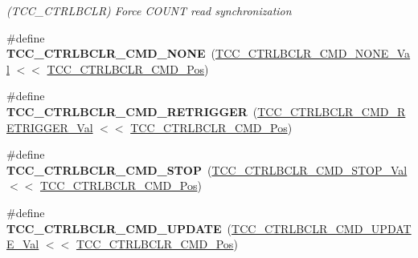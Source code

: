 \begin{DoxyCompactItemize}
\begin{DoxyCompactList}\small\item\em (T\+C\+C\+\_\+\+C\+T\+R\+L\+B\+C\+L\+R) Force C\+O\+U\+N\+T read synchronization \end{DoxyCompactList}\item 
\hypertarget{group___s_a_m_l21___t_c_c_ga9347040be57a1cf3a8c98400a5c7bdc2}{}\#define {\bfseries T\+C\+C\+\_\+\+C\+T\+R\+L\+B\+C\+L\+R\+\_\+\+C\+M\+D\+\_\+\+N\+O\+N\+E}~(\hyperlink{group___s_a_m_l21___t_c_c_ga6487842fdbdc4611ec51f7b8d14a4793}{T\+C\+C\+\_\+\+C\+T\+R\+L\+B\+C\+L\+R\+\_\+\+C\+M\+D\+\_\+\+N\+O\+N\+E\+\_\+\+Val}     $<$$<$ \hyperlink{group___s_a_m_l21___t_c_c_gadd633ac48572abb4f937fcbf892ef5e3}{T\+C\+C\+\_\+\+C\+T\+R\+L\+B\+C\+L\+R\+\_\+\+C\+M\+D\+\_\+\+Pos})\label{group___s_a_m_l21___t_c_c_ga9347040be57a1cf3a8c98400a5c7bdc2}

\item 
\hypertarget{group___s_a_m_l21___t_c_c_ga9b4ef0ecab4c2a201278e3179533f19a}{}\#define {\bfseries T\+C\+C\+\_\+\+C\+T\+R\+L\+B\+C\+L\+R\+\_\+\+C\+M\+D\+\_\+\+R\+E\+T\+R\+I\+G\+G\+E\+R}~(\hyperlink{group___s_a_m_l21___t_c_c_gafd176e0bf11648db1508e16fd14604b3}{T\+C\+C\+\_\+\+C\+T\+R\+L\+B\+C\+L\+R\+\_\+\+C\+M\+D\+\_\+\+R\+E\+T\+R\+I\+G\+G\+E\+R\+\_\+\+Val} $<$$<$ \hyperlink{group___s_a_m_l21___t_c_c_gadd633ac48572abb4f937fcbf892ef5e3}{T\+C\+C\+\_\+\+C\+T\+R\+L\+B\+C\+L\+R\+\_\+\+C\+M\+D\+\_\+\+Pos})\label{group___s_a_m_l21___t_c_c_ga9b4ef0ecab4c2a201278e3179533f19a}

\item 
\hypertarget{group___s_a_m_l21___t_c_c_ga972bca65b553371831dddee8da758695}{}\#define {\bfseries T\+C\+C\+\_\+\+C\+T\+R\+L\+B\+C\+L\+R\+\_\+\+C\+M\+D\+\_\+\+S\+T\+O\+P}~(\hyperlink{group___s_a_m_l21___t_c_c_ga8fb1e134b7238155403248d68e911e0b}{T\+C\+C\+\_\+\+C\+T\+R\+L\+B\+C\+L\+R\+\_\+\+C\+M\+D\+\_\+\+S\+T\+O\+P\+\_\+\+Val}     $<$$<$ \hyperlink{group___s_a_m_l21___t_c_c_gadd633ac48572abb4f937fcbf892ef5e3}{T\+C\+C\+\_\+\+C\+T\+R\+L\+B\+C\+L\+R\+\_\+\+C\+M\+D\+\_\+\+Pos})\label{group___s_a_m_l21___t_c_c_ga972bca65b553371831dddee8da758695}

\item 
\hypertarget{group___s_a_m_l21___t_c_c_gad84e655003e688d00c642ddfb3acdb27}{}\#define {\bfseries T\+C\+C\+\_\+\+C\+T\+R\+L\+B\+C\+L\+R\+\_\+\+C\+M\+D\+\_\+\+U\+P\+D\+A\+T\+E}~(\hyperlink{group___s_a_m_l21___t_c_c_ga17b5fd2fdc89e651857bf5bf381be5d1}{T\+C\+C\+\_\+\+C\+T\+R\+L\+B\+C\+L\+R\+\_\+\+C\+M\+D\+\_\+\+U\+P\+D\+A\+T\+E\+\_\+\+Val}   $<$$<$ \hyperlink{group___s_a_m_l21___t_c_c_gadd633ac48572abb4f937fcbf892ef5e3}{T\+C\+C\+\_\+\+C\+T\+R\+L\+B\+C\+L\+R\+\_\+\+C\+M\+D\+\_\+\+Pos})\label{group___s_a_m_l21___t_c_c_gad84e655003e688d00c642ddfb3acdb27}


\end{DoxyCompactItemize}
